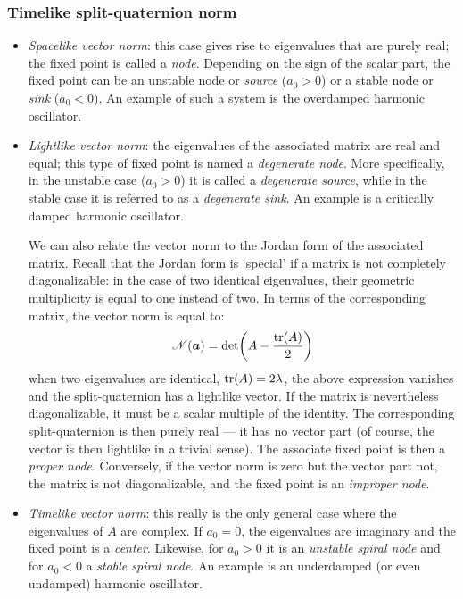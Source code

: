 \subsubsection*{Timelike split-quaternion norm}
    \begin{itemize}
        \item[\circled{4}] \emph{Spacelike vector norm}: this case gives rise to eigenvalues that are purely real; the fixed point is called a \emph{node}. Depending on the sign of the scalar part, the fixed point can be an unstable node or \emph{source} ($a_0 > 0$) or a stable node or \emph{sink} ($a_0 < 0$). An example of such a system is the overdamped harmonic oscillator.
        \item[\circled{5}] \emph{Lightlike vector norm}: the eigenvalues of the associated matrix are real and equal; this type of fixed point is named a \emph{degenerate node}. More specifically, in the unstable case ($a_0 > 0$) it is called a \emph{degenerate source}, while in the stable case it is referred to as a \emph{degenerate sink}. An example is a critically damped harmonic oscillator. 

        We can also relate the vector norm to the Jordan form of the associated matrix. Recall that the Jordan form is `special' if a matrix is not completely diagonalizable: in the case of two identical eigenvalues, their geometric multiplicity is equal to one instead of two. In terms of the corresponding matrix, the vector norm is equal to: 
            $$ \mathscr{N}(\vec{a}) = \det(A - \frac{\trace(A)}{2}) $$
        when two eigenvalues are identical, $\trace(A) = 2\lambda$, the above expression vanishes and the split-quaternion has a lightlike vector. If the matrix is nevertheless diagonalizable, it must be a scalar multiple of the identity. The corresponding split-quaternion is then purely real --- it has no vector part (of course, the vector is then lightlike in a trivial sense). The associate fixed point is then a \emph{proper node}. Conversely, if the vector norm is zero but the vector part not, the matrix is not diagonalizable, and the fixed point is an \emph{improper node}.
        \item[\circled{6}] \emph{Timelike vector norm}: this really is the only general case where the eigenvalues of $A$ are complex. If $a_0 = 0$, the eigenvalues are imaginary and the fixed point is a \emph{center}. Likewise, for $a_0 > 0$ it is an \emph{unstable spiral node} and for $a_0 < 0$ a \emph{stable spiral node}. An example is an underdamped (or even undamped) harmonic oscillator.
    \end{itemize}

